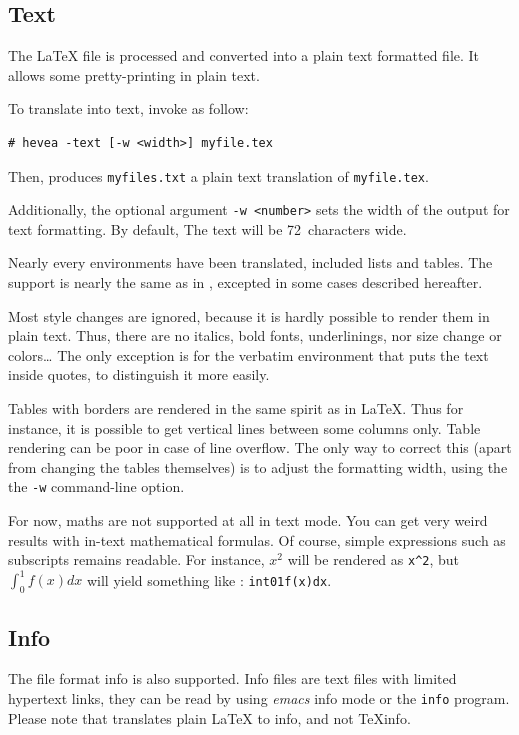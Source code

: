 \subsection{Text}
The \LaTeX{} file is processed and converted into a plain text
formatted file. It allows some pretty-printing in plain text.

To translate into text, invoke \hevea{} as follow:
\begin{verbatim}
# hevea -text [-w <width>] myfile.tex
\end{verbatim}
Then, \hevea{} produces \texttt{myfiles.txt} a plain text translation
of \texttt{myfile.tex}.

Additionally, the optional argument \texttt{-w <number>} sets the
width of the output for text formatting. By default, The text will be
72~characters wide.

Nearly every environments have been translated, included lists and tables.
The support is nearly the same as in \html, excepted in some cases
described hereafter.

Most style changes are ignored, because it is hardly
possible to render them in plain text. Thus, there are no italics,
bold fonts, underlinings, nor size change or colors\ldots{}
The only exception is for the verbatim environment
that puts the text inside quotes, to distinguish it more easily.

Tables with borders are rendered in the same spirit as in \LaTeX{}.
Thus for instance, it is possible to get vertical lines between some
columns only.
Table rendering can be poor in case of line overflow.
The only way to correct this (apart from changing the tables
themselves) is to adjust the formatting width, using the
the \texttt{-w} command-line option.

For now, maths are not supported at all in text mode. You can get very weird
results with in-text mathematical formulas.
Of course, simple expressions such as subscripts remains readable.
For instance, $x^2$ will be rendered as \verb+x^2+, but $\int_0^1f(x)dx$ will
yield something like : \verb+int01f(x)dx+.


\subsection{Info}
The file format info is also supported.
Info files are text files with limited hypertext links, they
can be read by using \emph{emacs} info mode or the
\texttt{info} program.
Please note that \hevea{} translates plain \LaTeX{} to info, and not
TeXinfo.

